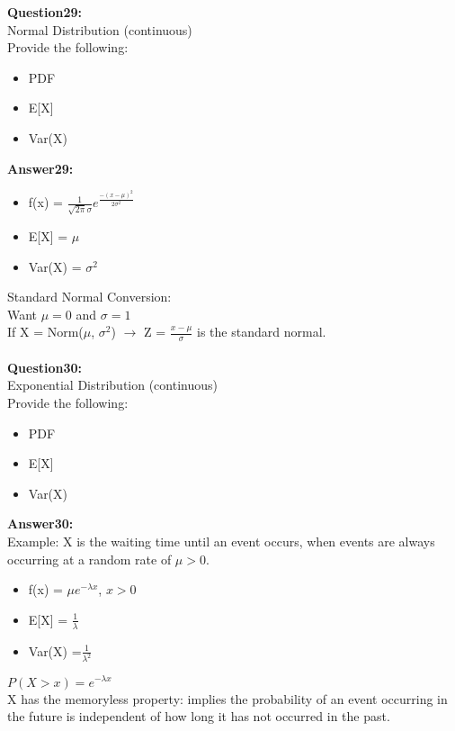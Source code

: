 \documentclass{article}
\begin{document}
\textbf{Question29:} \\
Normal Distribution (continuous)\\
Provide the following:
\begin{itemize}
	\item PDF
	\item E[X]
	\item Var(X)
\end{itemize}

\textbf{Answer29:} \\
\begin{itemize}
	\item f(x) = $\frac{1}{\sqrt{2\pi}\sigma}e^{\frac{-(x - \mu)^2}{2\sigma^2}}$
	\item E[X] = $\mu$
	\item Var(X) = $\sigma^2$
\end{itemize}
Standard Normal Conversion:\\
Want $\mu = 0$ and $\sigma = 1$ \\
If X = Norm($\mu$, $\sigma^2$) $\rightarrow$ Z = $\frac{x - \mu}{\sigma}$ is the standard normal.
\\\\


\textbf{Question30:} \\
Exponential Distribution (continuous)\\
Provide the following:
\begin{itemize}
	\item PDF
	\item E[X]
	\item Var(X)
\end{itemize}

\textbf{Answer30:} \\
Example: X is the waiting time until an event occurs, when events are always occurring at a random rate of $\mu > 0$.
\begin{itemize}
	\item f(x) = $\mu e^{-\lambda x}$, $x > 0$
	\item E[X] = $\frac{1}{\lambda}$
	\item Var(X) =$\frac{1}{\lambda^2}$
\end{itemize}
$P(X > x) = e^{-\lambda x}$ \\
X has the memoryless property: implies the probability of an event occurring in the future is independent of how long it has not occurred in the past.
\end{document}
